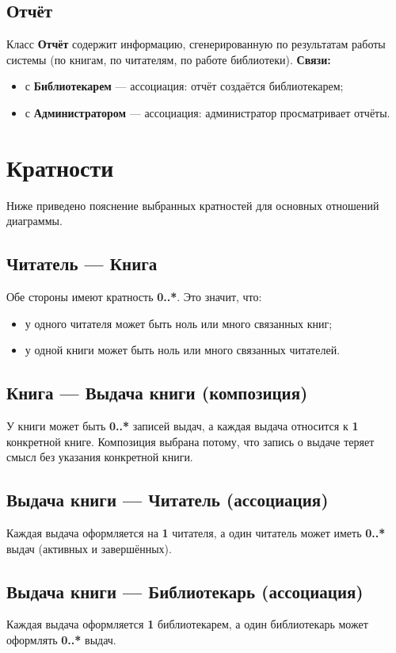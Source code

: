 \documentclass[a4paper,12pt]{article}
\begin{document}
\subsection{Отчёт}
Класс \textbf{Отчёт} содержит информацию, сгенерированную по результатам работы системы (по книгам, по читателям, по работе библиотеки).  
\textbf{Связи:}
\begin{itemize}
    \item с \textbf{Библиотекарем} — ассоциация: отчёт создаётся библиотекарем;
    \item с \textbf{Администратором} — ассоциация: администратор просматривает отчёты.
\end{itemize}

\section{Кратности}

Ниже приведено пояснение выбранных кратностей для основных отношений диаграммы.

\subsection{Читатель --- Книга}
Обе стороны имеют кратность \textbf{0..*}. Это значит, что:
\begin{itemize}
    \item у одного читателя может быть ноль или много связанных книг;
    \item у одной книги может быть ноль или много связанных читателей.
\end{itemize}

\subsection{Книга --- Выдача книги (композиция)}
У книги может быть \textbf{0..*} записей выдач, а каждая выдача относится к \textbf{1} конкретной книге. Композиция выбрана потому, что запись о выдаче теряет смысл без указания конкретной книги.

\subsection{Выдача книги --- Читатель (ассоциация)}
Каждая выдача оформляется на \textbf{1} читателя, а один читатель может иметь \textbf{0..*} выдач (активных и завершённых).

\subsection{Выдача книги --- Библиотекарь (ассоциация)}
Каждая выдача оформляется \textbf{1} библиотекарем, а один библиотекарь может оформлять \textbf{0..*} выдач.
\end{document}

